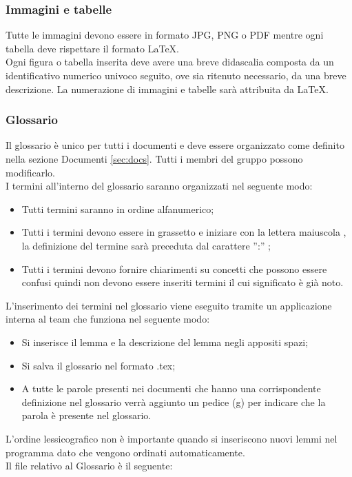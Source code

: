{{		\subsubsection{Immagini e tabelle}{
			\label{sub:img}
			Tutte le immagini devono essere in formato JPG, PNG o PDF mentre ogni tabella deve rispettare il formato \LaTeX.\\
			Ogni figura o tabella inserita deve avere una breve didascalia composta da un identificativo numerico univoco seguito, ove sia ritenuto necessario, da una breve descrizione. La numerazione di immagini e tabelle sarà attribuita da \LaTeX.\\			
			}
		}
\subsubsection{Glossario}{
 	Il glossario è unico per tutti i documenti e deve essere organizzato come definito nella sezione Documenti \ref{sec:docs}. Tutti i membri del gruppo possono modificarlo.\\
 	I termini all'interno del glossario saranno organizzati nel seguente modo:
 	\begin{itemize}
	 	\item Tutti termini saranno in ordine alfanumerico;
	 	\item Tutti i termini devono essere in grassetto e iniziare con la lettera maiuscola , la definizione del termine sarà preceduta dal carattere '':'' ;
	 	\item Tutti i termini devono fornire chiarimenti su concetti che possono essere confusi quindi non devono essere inseriti termini il cui significato è già noto.
 	\end{itemize}	
      L'inserimento dei termini nel glossario viene eseguito tramite un applicazione interna al team che funziona nel seguente modo:
      \begin{itemize}
	      \item Si inserisce il lemma e la descrizione del lemma negli appositi spazi;
	      \item Si salva il glossario nel formato .tex;
	      \item A tutte le parole presenti nei documenti che hanno una corrispondente definizione nel glossario  verrà aggiunto un pedice (g) per indicare che la parola è presente nel glossario.
      \end{itemize}  
   L'ordine lessicografico non è importante quando si inseriscono nuovi lemmi nel programma dato che vengono ordinati automaticamente.\\
   Il file relativo al Glossario è il seguente: \href{run:../../Esterni/\fGlossario}{\fEscapeGlossario}
}


}
